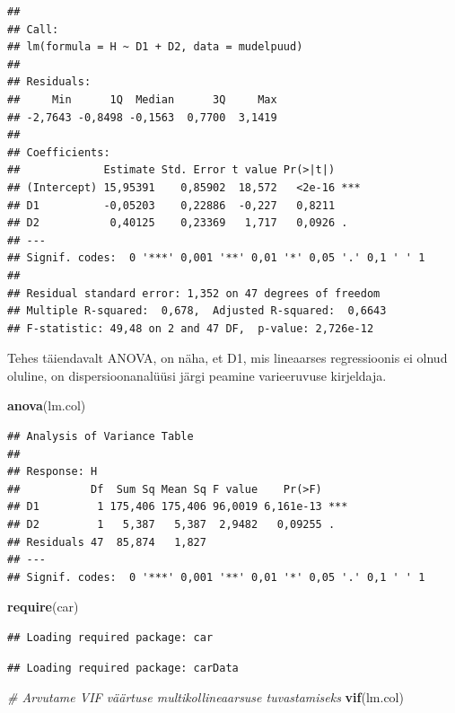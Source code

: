 \documentclass[
]{book}
\newenvironment{Shaded}{\begin{snugshade}}{\end{snugshade}}
\newcommand{\CommentTok}[1]{\textcolor[rgb]{0.56,0.35,0.01}{\textit{#1}}}
\newcommand{\FunctionTok}[1]{\textcolor[rgb]{0.13,0.29,0.53}{\textbf{#1}}}
\newcommand{\NormalTok}[1]{#1}
\renewenvironment{Shaded} {\begin{snugshade}\footnotesize} {\end{snugshade}}
\begin{document}
\begin{verbatim}
## 
## Call:
## lm(formula = H ~ D1 + D2, data = mudelpuud)
## 
## Residuals:
##     Min      1Q  Median      3Q     Max 
## -2,7643 -0,8498 -0,1563  0,7700  3,1419 
## 
## Coefficients:
##             Estimate Std. Error t value Pr(>|t|)    
## (Intercept) 15,95391    0,85902  18,572   <2e-16 ***
## D1          -0,05203    0,22886  -0,227   0,8211    
## D2           0,40125    0,23369   1,717   0,0926 .  
## ---
## Signif. codes:  0 '***' 0,001 '**' 0,01 '*' 0,05 '.' 0,1 ' ' 1
## 
## Residual standard error: 1,352 on 47 degrees of freedom
## Multiple R-squared:  0,678,  Adjusted R-squared:  0,6643 
## F-statistic: 49,48 on 2 and 47 DF,  p-value: 2,726e-12
\end{verbatim}

Tehes täiendavalt ANOVA, on näha, et D1, mis lineaarses regressioonis ei olnud oluline, on dispersioonanalüüsi järgi peamine varieeruvuse kirjeldaja.

\begin{Shaded}
\begin{Highlighting}[]
\FunctionTok{anova}\NormalTok{(lm.col)}
\end{Highlighting}
\end{Shaded}

\begin{verbatim}
## Analysis of Variance Table
## 
## Response: H
##           Df  Sum Sq Mean Sq F value    Pr(>F)    
## D1         1 175,406 175,406 96,0019 6,161e-13 ***
## D2         1   5,387   5,387  2,9482   0,09255 .  
## Residuals 47  85,874   1,827                      
## ---
## Signif. codes:  0 '***' 0,001 '**' 0,01 '*' 0,05 '.' 0,1 ' ' 1
\end{verbatim}

\begin{Shaded}
\begin{Highlighting}[]
\FunctionTok{require}\NormalTok{(car)}
\end{Highlighting}
\end{Shaded}

\begin{verbatim}
## Loading required package: car
\end{verbatim}

\begin{verbatim}
## Loading required package: carData
\end{verbatim}

\begin{Shaded}
\begin{Highlighting}[]
\CommentTok{\# Arvutame VIF väärtuse multikollineaarsuse tuvastamiseks}
\FunctionTok{vif}\NormalTok{(lm.col)}
\end{Highlighting}
\end{Shaded}
\end{document}
